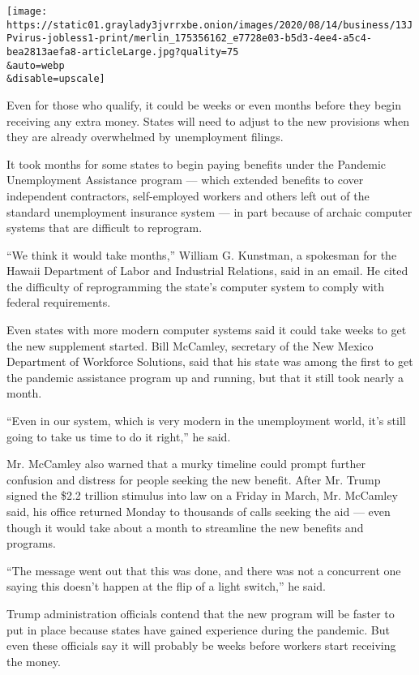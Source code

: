 \texttt{[image: https://static01.graylady3jvrrxbe.onion/images/2020/08/14/business/13JPvirus-jobless1-print/merlin\_175356162\_e7728e03-b5d3-4ee4-a5c4-bea2813aefa8-articleLarge.jpg?quality=75\\\&auto=webp\\\&disable=upscale]}

Even for those who qualify, it could be weeks or even months before they
begin receiving any extra money. States will need to adjust to the new
provisions when they are already overwhelmed by unemployment filings.

It took months for some states to begin paying benefits under the
Pandemic Unemployment Assistance program --- which extended benefits to
cover independent contractors, self-employed workers and others left out
of the standard unemployment insurance system --- in part because of
archaic computer systems that are difficult to reprogram.

``We think it would take months,'' William G. Kunstman, a spokesman for
the Hawaii Department of Labor and Industrial Relations, said in an
email. He cited the difficulty of reprogramming the state's computer
system to comply with federal requirements.

Even states with more modern computer systems said it could take weeks
to get the new supplement started. Bill McCamley, secretary of the New
Mexico Department of Workforce Solutions, said that his state was among
the first to get the pandemic assistance program up and running, but
that it still took nearly a month.

``Even in our system, which is very modern in the unemployment world,
it's still going to take us time to do it right,'' he said.

Mr. McCamley also warned that a murky timeline could prompt further
confusion and distress for people seeking the new benefit. After Mr.
Trump signed the \$2.2 trillion stimulus into law on a Friday in March,
Mr. McCamley said, his office returned Monday to thousands of calls
seeking the aid --- even though it would take about a month to
streamline the new benefits and programs.

``The message went out that this was done, and there was not a
concurrent one saying this doesn't happen at the flip of a light
switch,'' he said.

Trump administration officials contend that the new program will be
faster to put in place because states have gained experience during the
pandemic. But even these officials say it will probably be weeks before
workers start receiving the money.

